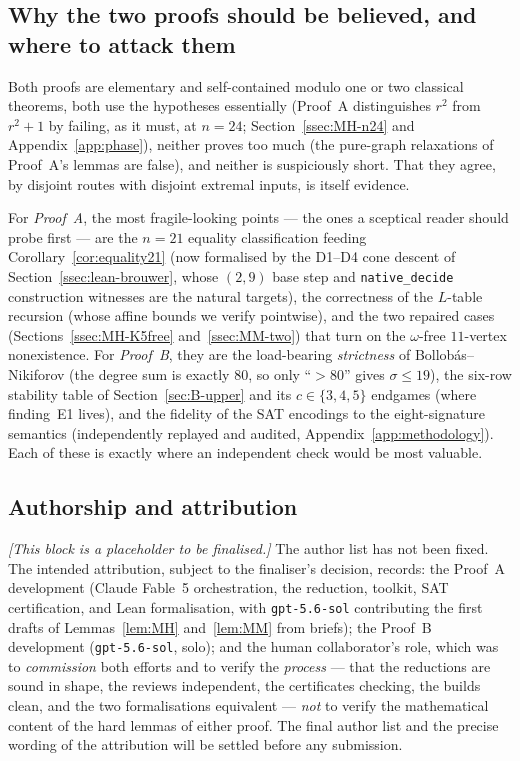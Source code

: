\documentclass[11pt,reqno]{amsart}
\theoremstyle{definition}
\theoremstyle{remark}
\begin{document}
\subsection{Why the two proofs should be believed, and where to attack them}
Both proofs are elementary and self-contained modulo one or two classical theorems, both
use the hypotheses essentially (Proof~A distinguishes $r^2$ from $r^2+1$ by failing, as it
must, at $n=24$; Section~\ref{ssec:MH-n24} and Appendix~\ref{app:phase}), neither proves
too much (the pure-graph relaxations of Proof~A's lemmas are false), and neither is
suspiciously short. That they agree, by disjoint routes with disjoint extremal inputs, is
itself evidence.

For \emph{Proof~A}, the most fragile-looking points --- the ones a sceptical reader should
probe first --- are the $n=21$ equality classification feeding
Corollary~\ref{cor:equality21} (now formalised by the D1--D4 cone descent of
Section~\ref{ssec:lean-brouwer}, whose $(2,9)$ base step and \texttt{native\_decide}
construction witnesses are the natural targets), the correctness of the $L$-table recursion
(whose affine bounds we verify pointwise), and the two repaired cases
(Sections~\ref{ssec:MH-K5free} and~\ref{ssec:MM-two}) that turn on the $\omega$-free
$11$-vertex nonexistence. For \emph{Proof~B}, they are the load-bearing \emph{strictness}
of Bollob\'as--Nikiforov (the degree sum is exactly $80$, so only ``$>80$'' gives
$\sigma\le 19$), the six-row stability table of Section~\ref{sec:B-upper} and its
$c\in\{3,4,5\}$ endgames (where finding~E1 lives), and the fidelity of the SAT encodings to
the eight-signature semantics (independently replayed and audited,
Appendix~\ref{app:methodology}). Each of these is exactly where an independent check would
be most valuable.

\subsection{Authorship and attribution}\label{ssec:authorship}
\emph{[This block is a placeholder to be finalised.]} The author list has not been fixed.
The intended attribution, subject to the finaliser's decision, records: the Proof~A
development (Claude Fable~5 orchestration, the reduction, toolkit, SAT certification, and
Lean formalisation, with \texttt{gpt-5.6-sol} contributing the first drafts of
Lemmas~\ref{lem:MH} and~\ref{lem:MM} from briefs); the Proof~B development
(\texttt{gpt-5.6-sol}, solo); and the human collaborator's role, which was to
\emph{commission} both efforts and to verify the \emph{process} --- that the reductions
are sound in shape, the reviews independent, the certificates checking, the builds clean,
and the two formalisations equivalent --- \emph{not} to verify the mathematical content of
the hard lemmas of either proof. The final author list and the precise wording of the
attribution will be settled before any submission.
\end{document}

